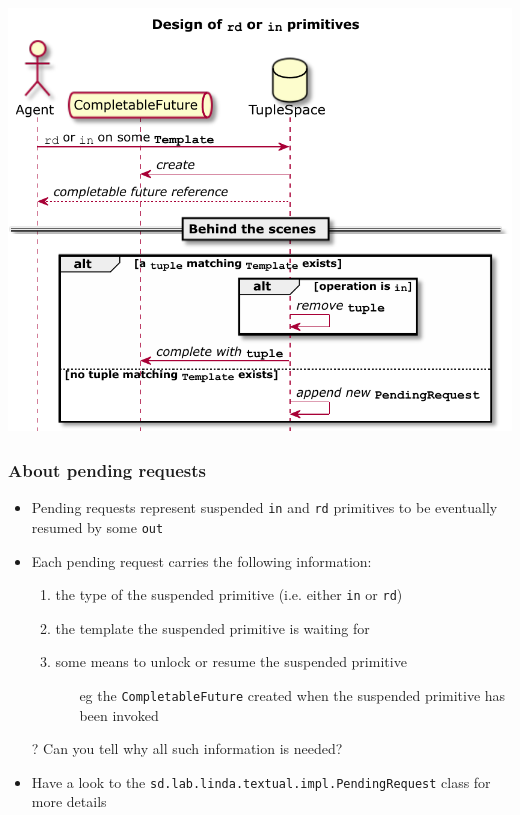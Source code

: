 \documentclass[presentation]{beamer}\mode<presentation>{\usetheme{AMSCesenaPurpleAndGold}}
\begin{document}
\begin{frame}

\begin{center}
	\includegraphics[width=.8\linewidth]{./img/rd-and-in-design.pdf}
\end{center}

\end{frame}

\begin{frame}
\frametitle{About pending requests}

\begin{itemize}
	\item Pending requests represent \alert{suspended} \texttt{in} and \texttt{rd} primitives to be eventually resumed by some \texttt{out}
	
	\vfill
	
	\item Each pending request carries the following information:
	\begin{enumerate}
		\item the \alert{type} of the suspended primitive (i.e. either \texttt{in} or \texttt{rd})
		\item the \alert{template} the suspended primitive is waiting for
		\item some means to \alert{unlock} or resume the suspended primitive
		\begin{itemize}
			\item[eg] the \texttt{\alert{CompletableFuture}} created when the suspended primitive has been invoked
		\end{itemize}
	\end{enumerate}

	\vfill
	
	\item[?] Can you tell \alert{why} all such information is needed?
	
	\vfill
	
	\item Have a look to the \texttt{sd.lab.linda.textual.impl.\alert{PendingRequest}} class for more details
\end{itemize}

\end{frame}
\end{document}
